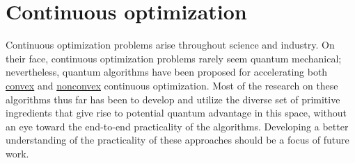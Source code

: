 
\section{Continuous optimization }\label{appl:ContinuousOpt}


Continuous optimization problems arise throughout science and industry. On their face, continuous optimization problems rarely seem quantum mechanical; nevertheless, quantum algorithms have been proposed for accelerating both \hyperref[appl:GeneralConvexOpt]{convex} and \hyperref[appl:EscapingSaddlePoints]{nonconvex} continuous optimization. Most of the research on these algorithms thus far has been to develop and utilize the diverse set of primitive ingredients that give rise to potential quantum advantage in this space, without an eye toward the end-to-end practicality of the algorithms. Developing a better understanding of the practicality of these approaches should be a focus of future work. 


\localtableofcontents

\newpage


